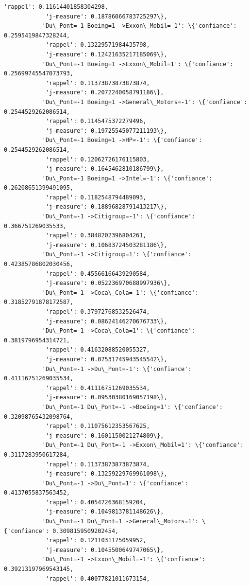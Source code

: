 \documentclass[11pt]{article}
\begin{document}
\begin{Verbatim}[commandchars=\\\{\}]
            'rappel': 0.11614401858304298,
            'j-measure': 0.18786066783725297\},
           'Du\_Pont=-1 Boeing=1 ->Exxon\_Mobil=-1': \{'confiance': 0.2595419847328244,
            'rappel': 0.13229571984435798,
            'j-measure': 0.12421635217185069\},
           'Du\_Pont=-1 Boeing=1 ->Exxon\_Mobil=1': \{'confiance': 0.25699745547073793,
            'rappel': 0.11373873873873874,
            'j-measure': 0.2072240058791186\},
           'Du\_Pont=-1 Boeing=1 ->General\_Motors=-1': \{'confiance': 0.2544529262086514,
            'rappel': 0.1145475372279496,
            'j-measure': 0.19725545077211193\},
           'Du\_Pont=-1 Boeing=1 ->HP=-1': \{'confiance': 0.2544529262086514,
            'rappel': 0.12062726176115803,
            'j-measure': 0.1645462810186799\},
           'Du\_Pont=-1 Boeing=1 ->Intel=-1': \{'confiance': 0.26208651399491095,
            'rappel': 0.1182548794489093,
            'j-measure': 0.18896828791413217\},
           'Du\_Pont=-1 ->Citigroup=-1': \{'confiance': 0.366751269035533,
            'rappel': 0.3848202396804261,
            'j-measure': 0.10683724503281186\},
           'Du\_Pont=-1 ->Citigroup=1': \{'confiance': 0.42385786802030456,
            'rappel': 0.45566166439290584,
            'j-measure': 0.052236970688997936\},
           'Du\_Pont=-1 ->Coca\_Cola=-1': \{'confiance': 0.31852791878172587,
            'rappel': 0.37972768532526474,
            'j-measure': 0.08624146270676733\},
           'Du\_Pont=-1 ->Coca\_Cola=1': \{'confiance': 0.3819796954314721,
            'rappel': 0.41632088520055327,
            'j-measure': 0.07531745943545542\},
           'Du\_Pont=-1 ->Du\_Pont=-1': \{'confiance': 0.41116751269035534,
            'rappel': 0.41116751269035534,
            'j-measure': 0.09530380169057198\},
           'Du\_Pont=-1 Du\_Pont=-1 ->Boeing=1': \{'confiance': 0.32098765432098764,
            'rappel': 0.11075612353567625,
            'j-measure': 0.1601150021274809\},
           'Du\_Pont=-1 Du\_Pont=-1 ->Exxon\_Mobil=1': \{'confiance': 0.3117283950617284,
            'rappel': 0.11373873873873874,
            'j-measure': 0.13259229769961098\},
           'Du\_Pont=-1 ->Du\_Pont=1': \{'confiance': 0.4137055837563452,
            'rappel': 0.4054726368159204,
            'j-measure': 0.1049813781148626\},
           'Du\_Pont=-1 Du\_Pont=1 ->General\_Motors=1': \{'confiance': 0.3098159509202454,
            'rappel': 0.1211031175059952,
            'j-measure': 0.1045500649747065\},
           'Du\_Pont=-1 ->Exxon\_Mobil=-1': \{'confiance': 0.39213197969543145,
            'rappel': 0.40077821011673154,

\end{Verbatim}
\end{document}

